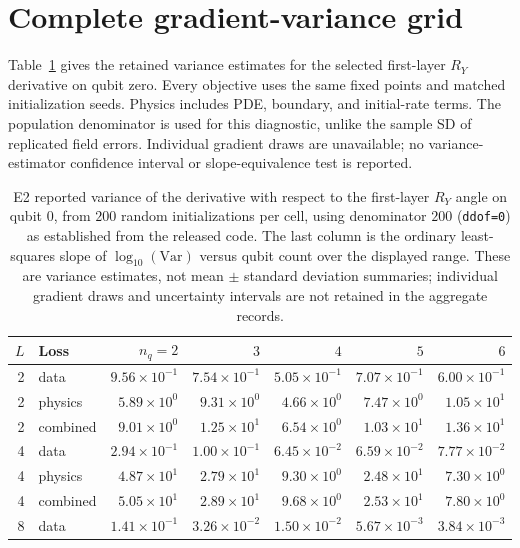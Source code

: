 \documentclass[11pt]{article}
\begin{document}
\section{Complete gradient-variance grid}

Table~\ref{tab:e2full} gives the retained variance estimates for the
selected first-layer $R_Y$ derivative on qubit zero. Every objective uses
the same fixed points and matched initialization seeds. Physics includes
PDE, boundary, and initial-rate terms. The population denominator is
used for this diagnostic, unlike the sample SD of replicated field errors.
Individual gradient draws are unavailable; no variance-estimator
confidence interval or slope-equivalence test is reported.

\begin{table}[htbp]
\centering
\caption{E2 reported variance of the derivative with respect to the first-layer $R_Y$ angle on qubit $0$, from $200$ random initializations per cell, using denominator $200$
(\texttt{ddof=0}) as established from the released code. The last column is the ordinary least-squares slope of $\log_{10}(\mathrm{Var})$ versus qubit count over the displayed range. These are variance estimates, not mean $\pm$ standard deviation summaries; individual gradient draws and uncertainty intervals are not retained
in the aggregate records.}
\label{tab:e2full}
\footnotesize
\setlength{\tabcolsep}{4pt}
\begin{tabular}{rlrrrrr}
\toprule
$L$ & Loss & $n_q=2$ & $3$ & $4$ & $5$ & $6$ \\
\midrule
2 & data & $9.56\times10^{-1}$ & $7.54\times10^{-1}$ & $5.05\times10^{-1}$ & $7.07\times10^{-1}$ & $6.00\times10^{-1}$ \\
2 & physics & $5.89\times10^{0}$ & $9.31\times10^{0}$ & $4.66\times10^{0}$ & $7.47\times10^{0}$ & $1.05\times10^{1}$ \\
2 & combined & $9.01\times10^{0}$ & $1.25\times10^{1}$ & $6.54\times10^{0}$ & $1.03\times10^{1}$ & $1.36\times10^{1}$ \\
\midrule
4 & data & $2.94\times10^{-1}$ & $1.00\times10^{-1}$ & $6.45\times10^{-2}$ & $6.59\times10^{-2}$ & $7.77\times10^{-2}$ \\
4 & physics & $4.87\times10^{1}$ & $2.79\times10^{1}$ & $9.30\times10^{0}$ & $2.48\times10^{1}$ & $7.30\times10^{0}$ \\
4 & combined & $5.05\times10^{1}$ & $2.89\times10^{1}$ & $9.68\times10^{0}$ & $2.53\times10^{1}$ & $7.80\times10^{0}$ \\
\midrule
8 & data & $1.41\times10^{-1}$ & $3.26\times10^{-2}$ & $1.50\times10^{-2}$ & $5.67\times10^{-3}$ & $3.84\times10^{-3}$ \\

\end{tabular}
\end{table}
\end{document}
